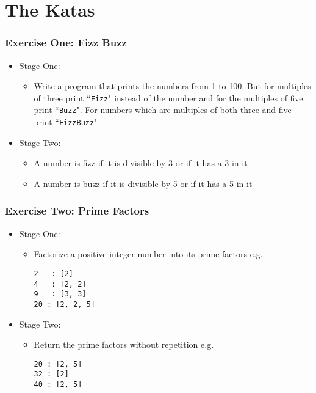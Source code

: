 \documentclass[10pt,t,sans,mathsans,xcolor=dvipsnames]{beamer}
\begin{document}
\section{The Katas}
\begin{frame}[fragile]
\frametitle{Exercise One: Fizz Buzz}
\begin{itemize}
\item Stage One:
\begin{itemize}
\item Write a program that prints the numbers from 1 to 100. But for multiples of three print ``\texttt{Fizz}" instead of the number and for the multiples of five print ``\texttt{Buzz}". For numbers which are multiples of both three and five print ``\texttt{FizzBuzz}"
\end{itemize}
\item Stage Two:
\begin{itemize}
\item A number is fizz if it is divisible by 3 or if it has a 3 in it
\item A number is buzz if it is divisible by 5 or if it has a 5 in it
\end{itemize}
\end{itemize}
\end{frame}
\begin{frame}[fragile]
\frametitle{Exercise Two: Prime Factors}
\begin{itemize}
\item Stage One:
\begin{itemize}
\item Factorize a positive integer number into its prime factors e.g.
\begin{verbatim}
2 	: [2]
4 	: [2, 2]
9 	: [3, 3]
20 : [2, 2, 5]
\end{verbatim}
\end{itemize}
\item Stage Two:
\begin{itemize}
\item Return the prime factors without repetition e.g.
\begin{verbatim}
20 : [2, 5]
32 : [2]
40 : [2, 5]
\end{verbatim}
\end{itemize}
\end{itemize}
\end{frame}
\end{document}
